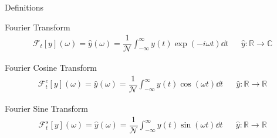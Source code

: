 
\begin{frame}{Definitions}
%
\begin{defbox}
\small
Fourier Transform
\begin{align*}
	\mathcal{F}_t[y](\omega)
=
	\hat{y}(\omega)
=
	\dfrac{1}{\mathcal{N}}	
	\int_{-\infty}^{\infty}
		y(t) \exp(-i\omega t) \dd{t}
&&
	\hat{y}: \mathbb{R} \to \mathbb{C}
\end{align*}

Fourier Cosine Transform
\begin{align*}
	\mathcal{F}^c_t[y](\omega)
=
	\hat{y}(\omega)
=
	\dfrac{1}{\mathcal{N}}
	\int_{-\infty}^{\infty}
		y(t) \cos(\omega t) \dd{t}
&&
	\hat{y}: \mathbb{R} \to \mathbb{R}
\end{align*}

Fourier Sine Transform
\begin{align*}
	\mathcal{F}^s_t[y](\omega)
=
	\hat{y}(\omega)
=
	\dfrac{1}{\mathcal{N}}
	\int_{-\infty}^{\infty}
		y(t) \sin(\omega t) \dd{t}
&&
	\hat{y}: \mathbb{R} \to \mathbb{R}
\end{align*}
\end{defbox}
%
\end{frame}


